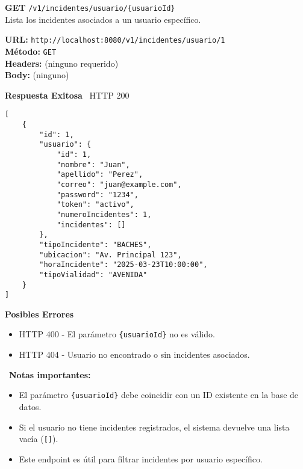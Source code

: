 \begin{tcolorbox}[endpoint]
    \textbf{GET} \texttt{/v1/incidentes/usuario/\{usuarioId\}}\\
    Lista los incidentes asociados a un usuario específico.
\end{tcolorbox}

\begin{tcolorbox}[request]
    \textbf{URL:} \textcolor{urlColor}{\texttt{http://localhost:8080/v1/incidentes/usuario/1}}\\
    \textbf{Método:} \textcolor{methodColor}{\texttt{GET}}\\
    \textbf{Headers:} (ninguno requerido)\\
    \textbf{Body:} (ninguno)
\end{tcolorbox}

\begin{tcolorbox}[response]
    \textbf{Respuesta Exitosa} \faCheckCircle\ \textcolor{successColor}{HTTP 200}
    \begin{verbatim}
[
    {
        "id": 1,
        "usuario": {
            "id": 1,
            "nombre": "Juan",
            "apellido": "Perez",
            "correo": "juan@example.com",
            "password": "1234",
            "token": "activo",
            "numeroIncidentes": 1,
            "incidentes": []
        },
        "tipoIncidente": "BACHES",
        "ubicacion": "Av. Principal 123",
        "horaIncidente": "2025-03-23T10:00:00",
        "tipoVialidad": "AVENIDA"
    }
]
    \end{verbatim}
    
    \textbf{Posibles Errores} \faExclamationTriangle
    \begin{itemize}
        \item \textcolor{errorColor}{HTTP 400} - El parámetro \texttt{\{usuarioId\}} no es válido.
        \item \textcolor{errorColor}{HTTP 404} - Usuario no encontrado o sin incidentes asociados.
    \end{itemize}
\end{tcolorbox}

\begin{tcolorbox}[notes]
    \faInfoCircle\ \textbf{Notas importantes:}
    \begin{itemize}
        \item El parámetro \texttt{\{usuarioId\}} debe coincidir con un ID existente en la base de datos.
        \item Si el usuario no tiene incidentes registrados, el sistema devuelve una lista vacía (\texttt{[]}).
        \item Este endpoint es útil para filtrar incidentes por usuario específico.
    \end{itemize}
\end{tcolorbox}

